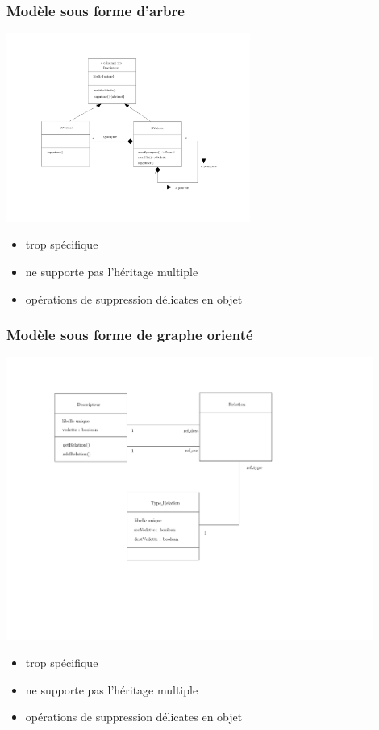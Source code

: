\documentclass{beamer}
\begin{document}
\begin{frame}
\frametitle{Modèle sous forme d'arbre}
\begin{center}
\includegraphics[width=8cm, trim = 0cm 2cm 2cm 2cm, clip=true]{diag_de_classe_old.pdf}
\end{center}
\begin{itemize}
\item trop spécifique
\item ne supporte pas l'héritage multiple
\item opérations de suppression délicates en objet
\end{itemize}
\end{frame}


\begin{frame}
\frametitle{Modèle sous forme de graphe orienté}
\begin{center}
\includegraphics[width=12cm]{diag_de_classe.pdf}
\end{center}
\begin{itemize}
\item trop spécifique
\item ne supporte pas l'héritage multiple
\item opérations de suppression délicates en objet
\end{itemize}
\end{frame}
\end{document}
